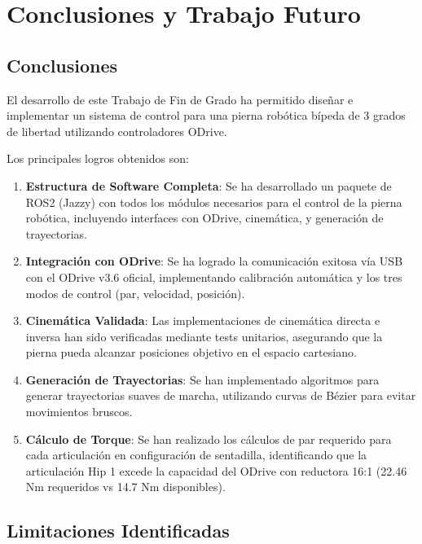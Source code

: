\chapter{Conclusiones y Trabajo Futuro}

\section{Conclusiones}

El desarrollo de este Trabajo de Fin de Grado ha permitido diseñar e implementar un sistema de control para una pierna robótica bípeda de 3 grados de libertad utilizando controladores ODrive.

Los principales logros obtenidos son:

\begin{enumerate}
    \item \textbf{Estructura de Software Completa}: Se ha desarrollado un paquete de ROS2 (Jazzy) con todos los módulos necesarios para el control de la pierna robótica, incluyendo interfaces con ODrive, cinemática, y generación de trayectorias.
    
    \item \textbf{Integración con ODrive}: Se ha logrado la comunicación exitosa vía USB con el ODrive v3.6 oficial, implementando calibración automática y los tres modos de control (par, velocidad, posición).
    
    \item \textbf{Cinemática Validada}: Las implementaciones de cinemática directa e inversa han sido verificadas mediante tests unitarios, asegurando que la pierna pueda alcanzar posiciones objetivo en el espacio cartesiano.
    
    \item \textbf{Generación de Trayectorias}: Se han implementado algoritmos para generar trayectorias suaves de marcha, utilizando curvas de Bézier para evitar movimientos bruscos.
    
    \item \textbf{Cálculo de Torque}: Se han realizado los cálculos de par requerido para cada articulación en configuración de sentadilla, identificando que la articulación Hip 1 excede la capacidad del ODrive con reductora 16:1 (22.46 Nm requeridos vs 14.7 Nm disponibles).
\end{enumerate}

\section{Limitaciones Identificadas}

